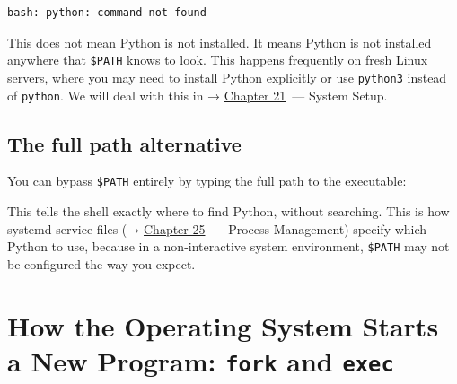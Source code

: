 \begin{outputbox}[short]
\begin{Verbatim}[fontsize=\codesize, breaklines, breakanywhere, breaksymbolleft={\tiny\textcolor{muted}{$\hookrightarrow$}}]
bash: python: command not found
\end{Verbatim}
\end{outputbox}

\noindent{}This does not mean Python is not installed. It means Python is not installed anywhere that \texttt{\$PATH} knows to look. This happens frequently on fresh Linux servers, where you may need to install Python explicitly or use \texttt{python3} instead of \texttt{python}. We will deal with this in → \hyperref[ch:21-system-setup]{Chapter 21}~--- System Setup.

\subsection*{The full path alternative}\label{01-command-to-process:the-full-path-alternative}

You can bypass \texttt{\$PATH} entirely by typing the full path to the executable:

\begin{codebox}[short]

\begin{Shaded}
\begin{Highlighting}[]
\end{Highlighting}
\end{Shaded}

\end{codebox}

\noindent{}This tells the shell exactly where to find Python, without searching. This is how systemd service files (→ \hyperref[ch:25-process-management]{Chapter 25}~--- Process Management) specify which Python to use, because in a non-interactive system environment, \texttt{\$PATH} may not be configured the way you expect.

\setcounter{section}{2}
\section{\texorpdfstring{How the Operating System Starts a New Program: \texttt{fork} and
\texttt{exec}}{How the Operating System Starts a New Program: fork and exec}}\label{01-command-to-process:13-how-the-operating-system-starts-a-new-program-fork-and-exec}

